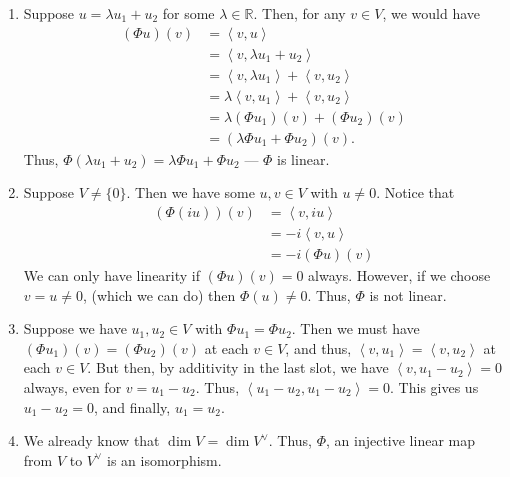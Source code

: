 \documentclass[12pt, letterpaper]{hmcpset}
\begin{document}
\begin{solution}
	\begin{enumerate}
		\item Suppose $u = \lambda u_{1} + u_{2}$ for some $\lambda \in \mathbb{R}$. Then, for any $v \in V$, we would have
			\[
				\begin{split}
					(\Phi u)(v) & = \left < v, u \right > \\
						    & = \left < v, \lambda u_{1} + u_{2} \right > \\
						    & = \left < v, \lambda u_{1} \right > + \left < v, u_{2} \right > \\
						    & = \lambda \left < v, u_{1} \right > + \left < v, u_{2} \right > \\
						    & = \lambda (\Phi u_{1})(v) + (\Phi u_{2})(v) \\
						    & = (\lambda \Phi u_{1} + \Phi u_{2})(v).
				\end{split}
			\]
			Thus, $\Phi (\lambda u_{1} + u_{2}) = \lambda \Phi u_{1} + \Phi u_{2}$ --- $\Phi$ is linear.
		\item Suppose $V \neq \{ 0 \}$. Then we have some $u, v \in V$ with $u \neq 0$. Notice that
			\[
				\begin{split}
					(\Phi (iu))(v) & = \left < v, iu \right > \\
						    & = -i \left < v, u \right > \\
						    & = - i (\Phi u)(v)
				\end{split}
			\]
			We can only have linearity if $(\Phi u)(v) = 0$ always. However, if we choose $v = u \neq 0$, (which we can do) then $\Phi(u) \neq 0$. Thus, $\Phi$ is not linear.
		\item Suppose we have $u_{1}, u_{2} \in V$ with $\Phi u_{1} = \Phi u_{2}$. Then we must have $(\Phi u_{1})(v) = (\Phi u_{2})(v)$ at each $v \in V$, and thus, $\left < v, u_{1} \right > = \left < v, u_{2} \right >$ at each $v \in V$. But then, by additivity in the last slot, we have $\left < v, u_{1} - u_{2} \right > = 0$ always, even for $v = u_{1} - u_{2}$. Thus, $\left < u_{1} - u_{2}, u_{1} - u_{2} \right > = 0$. This gives us $u_{1} - u_{2} = 0$, and finally, $u_{1} = u_{2}$.
		\item We already know that $\dim V = \dim V^{\vee}$. Thus, $\Phi$, an injective linear map from $V$ to $V^{\vee}$ is an isomorphism.
	\end{enumerate}
\end{solution}
\end{document}
